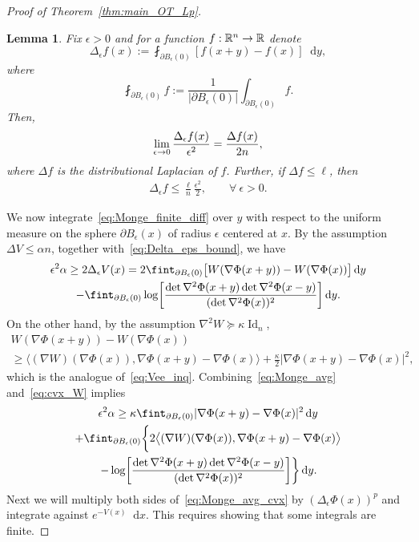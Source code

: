 \documentclass[10pt]{amsart}
\newtheorem{lemm}[theo]{Lemma}\newtheorem{prop}[theo]{Proposition}\newtheorem{coro}[theo]{Corollary}\newtheorem{conj}[theo]{Conjecture}
\theoremstyle{definition}\newtheorem{defi}[theo]{Definition}\newtheorem{rema}[theo]{Remark}\newtheorem{exam}[theo]{Example}\newtheorem{exem}[theo]{Example}\newtheorem{nota}[theo]{Notation}
\newcommand{\R}{\mathbb R}
\DeclareMathOperator{\Id}{Id}
\newcommand{\W}{W}
\newcommand{\dd}{n}
\newcommand{\lsh}{\alpha}
\newcommand{\lc}{\kappa}
\newcommand*\diff{\mathop{}\!\mathrm{d}}
\newcommand{\OT}{\Phi}
\newcommand{\avgint}{\fint}
\renewcommand*{\to}{\mathchoice{\longrightarrow}{\rightarrow}{\rightarrow}{\rightarrow}}
\let\originalleft\left
\let\originalright\right
\renewcommand{\left}{\mathopen{}\mathclose\bgroup\originalleft}
\renewcommand{\right}{\aftergroup\egroup\originalright}
\let\oldforall\forall
\renewcommand*{\forall}{\mathrel{\oldforall}}
\begin{document}
\begin{proof}[Proof of Theorem~\ref{thm:main_OT_Lp}]
\begin{lemm}\label{lem:avg_Laplacian}
Fix $\epsilon> 0$ and for a function $f:\R^{\dd}\to\R$ denote
\begin{equation}\label{eq:avg_Laplacian_def}
\Delta_{\epsilon}f(x):=\avgint_{\partial B_{\epsilon}(0)}[f(x+y)-f(x)]\diff y,
\end{equation}
where
\[
\avgint_{\partial B_{\epsilon}(0)}f:=\frac{1}{|\partial B_{\epsilon}(0)|}\int_{\partial B_{\epsilon}(0)}f.
\]
Then,
\begin{align}\label{eq:Delta_eps_lim}
\lim_{\epsilon\to 0}\frac{\Delta_{\epsilon}f(x)}{\epsilon^{2}}=\frac{\Delta f(x)}{2\dd},
\end{align}
where $\Delta f$ is the distributional Laplacian of $f$. Further, if $\Delta f\le \ell$, then
\begin{align}\label{eq:Delta_eps_bound}
\Delta_{\epsilon}f\le \frac{\ell}{\dd}\frac{\epsilon^2}{2},\quad \quad\forall~\epsilon>0.
\end{align}
\end{lemm}

We now integrate~\eqref{eq:Monge_finite_diff} over $y$ with respect to the uniform measure on the sphere $\partial B_{\epsilon}(x)$ of radius $\epsilon$ centered at $x$. By the assumption $\Delta V\le \lsh\dd$, together with~\eqref{eq:Delta_eps_bound}, we have
\begin{multline}\label{eq:Monge_avg}
\epsilon^2 \lsh\ge 2\Delta_{\epsilon}V(x)=2\avgint_{\partial B_{\epsilon}(0)}\bigl[\W(\nabla\OT(x+y))-\W(\nabla\OT(x))\bigr]\diff y
\\
-\avgint_{\partial B_{\epsilon}(0)}\log\left[\frac{\det \nabla^2\OT(x+y)\det \nabla^2\OT(x-y)}{(\det \nabla^2\OT(x))^2}\right]\diff y.
\end{multline}
On the other hand, by the assumption $\nabla^2\W \succeq \lc \Id_{\dd}$,
\begin{multline}\label{eq:cvx_W}
\W(\nabla\OT(x+y))-\W(\nabla\OT(x))\\
\ge \bigl\langle (\nabla \W)(\nabla\OT(x)),\nabla\OT(x+y)-\nabla\OT(x)\bigr\rangle+\frac{\lc}{2}|\nabla\OT(x+y)-\nabla\OT(x)|^2,
\end{multline}
which is the analogue of~\eqref{eq:Vee_inq}. Combining~\eqref{eq:Monge_avg} and~\eqref{eq:cvx_W} implies
\begin{multline}\label{eq:Monge_avg_cvx}
\epsilon^2 \lsh \ge \lc\avgint_{\partial B_{\epsilon}(0)}|\nabla\OT(x+y)-\nabla\OT(x)|^2\diff y
\\
+\avgint_{\partial B_{\epsilon}(0)}\bigg\{2\bigl\langle (\nabla \W)(\nabla\OT(x)),\nabla\OT(x+y)-\nabla\OT(x)\bigr\rangle\\
\left.-\log\left[\frac{\det \nabla^2\OT(x+y)\det \nabla^2\OT(x-y)}{(\det \nabla^2\OT(x))^2}\right]\right\}\diff y.
\end{multline}
Next we will multiply both sides of~\eqref{eq:Monge_avg_cvx} by $(\Delta_{\epsilon}\OT(x))^p$ and integrate against $e^{-V(x)}\diff x$. This requires showing that some integrals are finite.


\end{proof}
\end{document}
